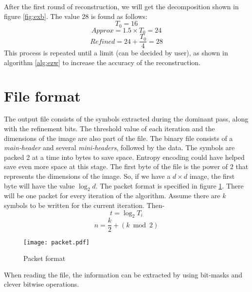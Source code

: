 \documentclass[./A14_Report.tex]{subfiles}
\begin{document}
After the first round of reconstruction, we will get the decomposition shown in
figure \ref{fig:exb}. The value $28$ is found as follows:
\begin{displaymath}
    T_0 = 16
\end{displaymath}
\begin{displaymath}
    Approx = 1.5 \times T_0 = 24
\end{displaymath}
\begin{displaymath}
    Refined = 24 + \frac{T_0}{4} = 28
\end{displaymath}
This process is repeated until a limit (can be decided by user), as shown in
algorithm \ref{alg:ezw} to increase the accuracy of the reconstruction.

\section{File format}
The output file consists of the symbols extracted during the dominant pass,
along with the refinement bits. The threshold value of each iteration and the
dimensions of the image are also part of the file. The binary file consists of
a \textit{main-header} and several \textit{mini-headers}, followed by the data.
The symbols are packed 2 at a time into bytes to save space. Entropy encoding
could have helped save even more space at this stage. The first byte of the
file is the power of $2$ that represents the dimensions of the image. So, if we
have a $d \times d$ image, the first byte will have the value $\log_2{d}$.  The
packet format is specified in figure \ref{fig:packet}. There will be one packet
for every iteration of the algorithm. Assume there are $k$ symbols to be
written for the current iteration. Then-
\begin{displaymath}
    t = \log_2{T_i}
\end{displaymath}
\begin{displaymath}
    n = \frac{k}{2} + (k \bmod 2)
\end{displaymath}

\begin{figure}[H]
    \centering
    \texttt{[image: packet.pdf]}
    \caption{Packet format}
    \label{fig:packet}
\end{figure}

When reading the file, the information can be extracted by using bit-masks and
clever bitwise operations.
\end{document}

